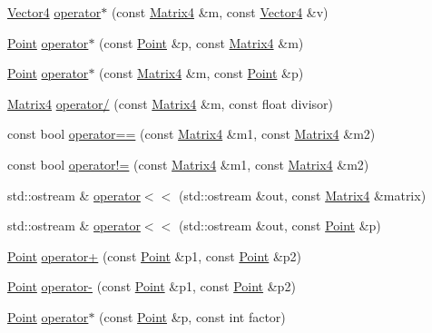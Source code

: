 \begin{DoxyCompactItemize}
\item 
\hyperlink{classprism_1_1_vector4}{Vector4} \hyperlink{namespaceprism_ad125bd8304d577b6f879fb973f774eb8}{operator$\ast$} (const \hyperlink{classprism_1_1_matrix4}{Matrix4} \&m, const \hyperlink{classprism_1_1_vector4}{Vector4} \&v)
\item 
\hyperlink{classprism_1_1_point}{Point} \hyperlink{namespaceprism_a44373b8bda7131a90d04eef7e455ea6f}{operator$\ast$} (const \hyperlink{classprism_1_1_point}{Point} \&p, const \hyperlink{classprism_1_1_matrix4}{Matrix4} \&m)
\item 
\hyperlink{classprism_1_1_point}{Point} \hyperlink{namespaceprism_a82522932359d2381607cf1fe0c898011}{operator$\ast$} (const \hyperlink{classprism_1_1_matrix4}{Matrix4} \&m, const \hyperlink{classprism_1_1_point}{Point} \&p)
\item 
\hyperlink{classprism_1_1_matrix4}{Matrix4} \hyperlink{namespaceprism_a517b4bc9b0ccc23f79b744d93b540fa6}{operator/} (const \hyperlink{classprism_1_1_matrix4}{Matrix4} \&m, const float divisor)
\item 
const bool \hyperlink{namespaceprism_a8804ec2ab8dda9441d64e947f05e293c}{operator==} (const \hyperlink{classprism_1_1_matrix4}{Matrix4} \&m1, const \hyperlink{classprism_1_1_matrix4}{Matrix4} \&m2)
\item 
const bool \hyperlink{namespaceprism_a4d184994eec61a1511fc936a9facb69a}{operator!=} (const \hyperlink{classprism_1_1_matrix4}{Matrix4} \&m1, const \hyperlink{classprism_1_1_matrix4}{Matrix4} \&m2)
\item 
std\+::ostream \& \hyperlink{namespaceprism_ab65e15b3e601e0570beb49a11610c671}{operator$<$$<$} (std\+::ostream \&out, const \hyperlink{classprism_1_1_matrix4}{Matrix4} \&matrix)
\item 
std\+::ostream \& \hyperlink{namespaceprism_acb9fe7ab8ef5f1ee0338e3b057624393}{operator$<$$<$} (std\+::ostream \&out, const \hyperlink{classprism_1_1_point}{Point} \&p)
\item 
\hyperlink{classprism_1_1_point}{Point} \hyperlink{namespaceprism_a49e983b5c32c93114583309eda19dc2b}{operator+} (const \hyperlink{classprism_1_1_point}{Point} \&p1, const \hyperlink{classprism_1_1_point}{Point} \&p2)
\item 
\hyperlink{classprism_1_1_point}{Point} \hyperlink{namespaceprism_a505cbd94f024ad80136afe0b751da08a}{operator-\/} (const \hyperlink{classprism_1_1_point}{Point} \&p1, const \hyperlink{classprism_1_1_point}{Point} \&p2)
\item 
\hyperlink{classprism_1_1_point}{Point} \hyperlink{namespaceprism_a40976ce143923309d4c737bb8288d9e5}{operator$\ast$} (const \hyperlink{classprism_1_1_point}{Point} \&p, const int factor)

\end{DoxyCompactItemize}
